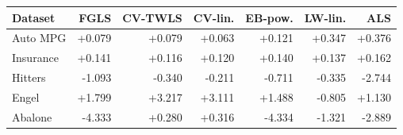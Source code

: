\begin{tabular}{@{}lrrrrrr@{}}
\toprule
Dataset & FGLS & CV-TWLS & CV-lin. & EB-pow. & LW-lin. & ALS \\
\midrule
Auto MPG & +0.079 & +0.079 & +0.063 & +0.121 & +0.347 & +0.376 \\
Insurance & +0.141 & +0.116 & +0.120 & +0.140 & +0.137 & +0.162 \\
Hitters & -1.093 & -0.340 & -0.211 & -0.711 & -0.335 & -2.744 \\
Engel & +1.799 & +3.217 & +3.111 & +1.488 & -0.805 & +1.130 \\
Abalone & -4.333 & +0.280 & +0.316 & -4.334 & -1.321 & -2.889 \\
\bottomrule
\end{tabular}
